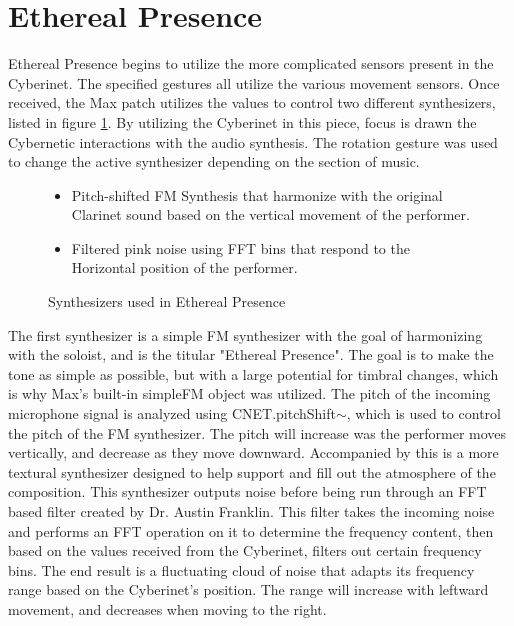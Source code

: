 \section{Ethereal Presence}
Ethereal Presence  begins to utilize the more complicated sensors present in the Cyberinet. The specified gestures all utilize the various movement sensors. Once received, the Max patch utilizes the values to control two different synthesizers, listed in figure \ref{fig:etherealSynths}. By utilizing the Cyberinet in this piece, focus is drawn the Cybernetic interactions with the audio synthesis. The rotation gesture was used to change the active synthesizer depending on the section of music.

\begin{figure}
    \centering
\begin{itemize}
    \item Pitch-shifted FM Synthesis that harmonize with the original Clarinet sound based on the vertical movement of the performer.
    \item Filtered pink noise using FFT bins that respond to the Horizontal position of the performer.
\end{itemize}
    \caption{Synthesizers used in Ethereal Presence}
    \label{fig:etherealSynths}
\end{figure}



The first synthesizer is a simple FM synthesizer with the goal of harmonizing with the soloist, and is the titular "Ethereal Presence". The goal is to make the tone as simple as possible, but with a large potential for timbral changes, which is why Max's built-in simpleFM object was utilized. The pitch of the incoming microphone signal is analyzed using CNET.pitchShift$\sim$, which is used to control the pitch of the FM synthesizer. The pitch will increase was the performer moves vertically, and decrease as they move downward. Accompanied by this is a more textural synthesizer designed to help support and fill out the atmosphere of the composition. This synthesizer outputs noise before being run through an FFT based filter created by Dr. Austin Franklin\cite{pnpMaxTools}. This filter takes the incoming noise and performs an FFT operation on it to determine the frequency content, then based on the values received from the Cyberinet, filters out certain frequency bins. The end result is a fluctuating cloud of noise that adapts its frequency range based on the Cyberinet's position. The range will increase with leftward movement, and decreases when moving to the right.


